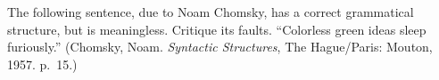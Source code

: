 The following sentence, due to Noam Chomsky,  has a correct grammatical structure, but is meaningless.  Critique its faults.  ``Colorless green ideas sleep furiously.''  (Chomsky, Noam. {\sl Syntactic Structures}, The Hague/Paris: Mouton, 1957. p.\ 15.)